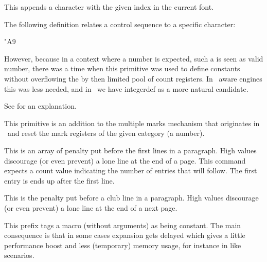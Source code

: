 \stopnewprimitive

\startoldprimitive[title={\prm {char}}]

This appends a character with the given index in the current font.

\stopoldprimitive

\startoldprimitive[title={\prm {chardef}}]

The following definition relates a control sequence to a specific character:

\starttyping
\chardef\copyrightsign"A9
\stoptyping

However, because in a context where a number is expected, such a 
is seen as valid number, there was a time when this primitive was used to define
constants without overflowing the by then limited pool of count registers. In
\ETEX\ aware engines this was less needed, and in \LUAMETATEX\ we have \prm
{integerdef} as a more natural candidate.

\stopoldprimitive

\startoldprimitive[title={\prm {cleaders}}]

See  for an explanation.

\stopoldprimitive

\startnewprimitive[title={\prm {clearmarks}}]

This primitive is an addition to the multiple marks mechanism that originates in
\ETEX\ and reset the mark registers of the given category (a number).

\stopnewprimitive

\startoldprimitive[title={\prm {clubpenalties}}]

This is an array of penalty put before the first lines in a paragraph. High values
discourage (or even prevent) a lone line at the end of a page. This
command expects a count value indicating the number of entries that will follow.
The first entry is ends up after the first line.

\stopoldprimitive

\startoldprimitive[title={\prm {clubpenalty}}]

This is the penalty put before a club line in a paragraph. High values discourage
(or even prevent) a lone line at the end of a next page.

\stopoldprimitive

\startnewprimitive[title={\prm {constant}}]

This prefix tags a macro (without arguments) as being constant. The main
consequence is that in some cases expansion gets delayed which gives a little
performance boost and less (temporary) memory usage, for instance in \type
{\csname} like scenarios.

